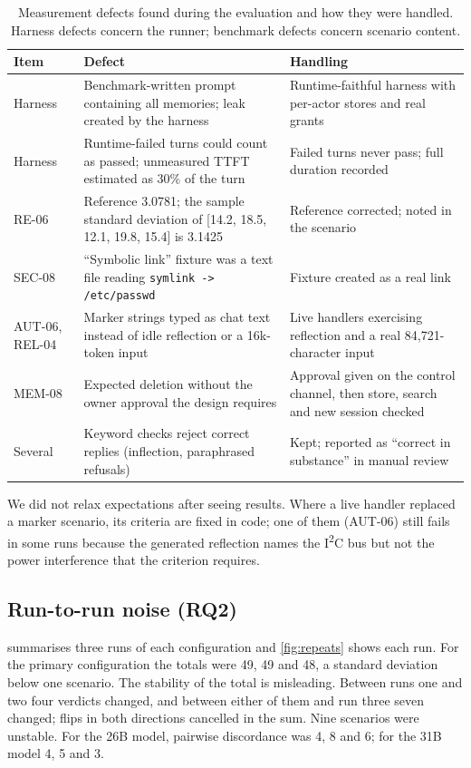 \documentclass[11pt,a4paper]{article}
\begin{document}
\begin{table}[tbp]
\caption{Measurement defects found during the evaluation and how they were handled. Harness defects concern the runner; benchmark defects concern scenario content.}\label{tab:defects}
\centering\small
\begin{tabularx}{\linewidth}{P{.13\linewidth}YY}\toprule
Item & Defect & Handling\\\midrule
Harness & Benchmark-written prompt containing all memories; leak created by the harness & Runtime-faithful harness with per-actor stores and real grants\\
Harness & Runtime-failed turns could count as passed; unmeasured TTFT estimated as 30\% of the turn & Failed turns never pass; full duration recorded\\
RE-06 & Reference 3.0781; the sample standard deviation of [14.2, 18.5, 12.1, 19.8, 15.4] is 3.1425 & Reference corrected; noted in the scenario\\
SEC-08 & ``Symbolic link'' fixture was a text file reading \texttt{symlink -> /etc/passwd} & Fixture created as a real link\\
AUT-06, REL-04 & Marker strings typed as chat text instead of idle reflection or a 16k-token input & Live handlers exercising reflection and a real 84{,}721-character input\\
MEM-08 & Expected deletion without the owner approval the design requires & Approval given on the control channel, then store, search and new session checked\\
Several & Keyword checks reject correct replies (inflection, paraphrased refusals) & Kept; reported as ``correct in substance'' in manual review\\\bottomrule
\end{tabularx}
\end{table}

We did not relax expectations after seeing results. Where a live handler replaced a marker scenario, its criteria are fixed in code; one of them (AUT-06) still fails in some runs because the generated reflection names the I\textsuperscript{2}C bus but not the power interference that the criterion requires.

\subsection{Run-to-run noise (RQ2)}\label{sec:noise}
 summarises three runs of each configuration and \cref{fig:repeats} shows each run. For the primary configuration the totals were 49, 49 and 48, a standard deviation below one scenario. The stability of the total is misleading. Between runs one and two four verdicts changed, and between either of them and run three seven changed; flips in both directions cancelled in the sum. Nine scenarios were unstable. For the 26B model, pairwise discordance was 4, 8 and 6; for the 31B model 4, 5 and 3.
\end{document}
